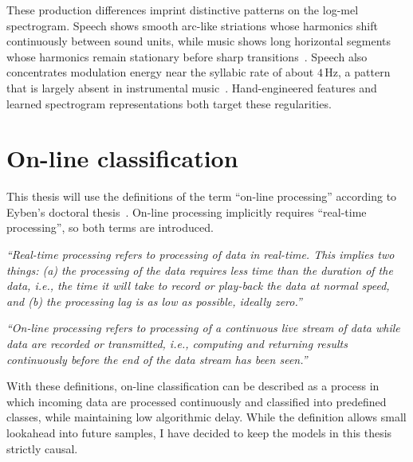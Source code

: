 These production differences imprint distinctive patterns on the log-mel spectrogram.
Speech shows smooth arc-like striations whose harmonics shift continuously between sound units, while music shows long horizontal segments whose harmonics remain stationary before sharp transitions~\cite{bhattacharjee2018sps}.
Speech also concentrates modulation energy near the syllabic rate of about $4$\,Hz, a pattern that is largely absent in instrumental music~\cite{khonglah2016gmmsvm}.
Hand-engineered features and learned spectrogram representations both target these regularities.

\section{On-line classification}
\label{sec:online_classification}
This thesis will use the definitions of the term ``on-line processing'' according to Eyben's doctoral thesis~\cite{eyben2016realtime}.
On-line processing implicitly requires ``real-time processing'', so both terms are introduced.

\textit{``Real-time processing refers to processing of data in real-time.
This implies two things: (a) the processing of the data requires less time than the duration of the data, i.e., the time it will take to record or play-back the data at normal speed, and (b) the processing lag is as low as possible, ideally zero.''}~\cite[p.~139]{eyben2016realtime}

\textit{``On-line processing refers to processing of a continuous live stream of data while data are recorded or transmitted, i.e., computing and returning results continuously before the end of the data stream has been seen.''}~\cite[pp.~139--140]{eyben2016realtime}

With these definitions, on-line classification can be described as a process in which incoming data are processed continuously and classified into predefined classes, while maintaining low algorithmic delay.
While the definition allows small lookahead into future samples, I have decided to keep the models in this thesis strictly causal.

